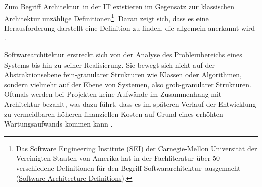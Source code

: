 Zum Begriff \glqq Architektur\grqq\ in der IT existieren im Gegensatz zur klassischen Architektur unzählige Definitionen\footnote{Das Software Engineering Institute (SEI) der Carnegie-Mellon Universität der Vereinigten Staaten von Amerika hat in der Fachliteratur über 50 verschiedene Definitionen für den Begriff \glqq Softwararchitektur\grqq\ ausgemacht (\href{http://www.sei.cmu.edu/architecture/definitions.html}{Software Architecture Definitions}).}. Daran zeigt sich, dass es eine Herausforderung darstellt eine Definition zu finden, die allgemein anerkannt wird \citereset \autocite[siehe][]{Shaw.1996}.

Softwarearchitektur erstreckt sich von der Analyse des Problembereichs eines Systems bis hin zu seiner Realisierung. Sie bewegt sich nicht auf der Abstraktionsebene fein-granularer Strukturen wie Klassen oder Algorithmen, sondern vielmehr auf der Ebene von Systemen, also grob-granularer Strukturen. Oftmals werden bei Projekten keine Aufwände im Zusammenhang mit Architektur bezahlt, was dazu führt, dass es im späteren Verlauf der Entwicklung zu vermeidbaren höheren finanziellen Kosten auf Grund eines erhöhten Wartungsaufwands kommen kann \citereset \autocite[siehe][S. 8-11]{Vogel.2009}.

